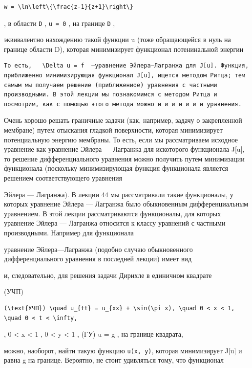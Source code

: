 \documentclass[
  ukrainian,
]{article}
\begin{document}
\begin{verbatim}
w = \ln\left\{\frac{z-1}{z+1}\right\}
\end{verbatim}

, в области \texttt{D} , \texttt{u\ =\ 0} , на границе \texttt{D} ,

эквивалентно нахождению такой функции u (тоже обращающейся в нуль на
границе области D), которая минимизирует функционал потенинальной
энергии

\begin{verbatim}
То есть,   \Delta u = f  —уравнение Эйлера—Лагранжа для J[u]. Функция, приближенно минимизирующая функционал J[u], ищется методом Ритца; тем самым мы получаем решение (приближениое) уравнения с частными производными. В этой лекции мы познакомимся с методом Ритца и посмотрим, как с помощью этого метода можно и и и и и и и уравнения.
\end{verbatim}

Очень хорошо решать граничные задачи (как, например, задачу о
закрепленной мембране) путем отыскания гладкой поверхности, которая
минимизирует потенциальную энергию мембраны. То есть, если мы
рассматриваем исходное уравнение как уравнение Эйлера --- Лагранжа для
искоторого функционала J{[}u{]}, то решение дифференциального уравнения
можно получить путем минимизации функционала (поскольку минимизирующая
функция функционала является решением соответствующего уравнения

Эйлера --- Лагранжа). В лекции 44 мы рассматривали такие функционалы, у
которых уравнение Эйлера --- Лагранжа было обыкновенным дифференциальным
уравнением. В этой лекции рассматриваются функционалы, для которых
уравнение Эйлера --- Лагранжа относится к классу уравнений с частными
производными. Например для функционала

уравнение Эйлера---Лагранжа (подобно случаю обыкновенного
дифференциального уравнения в последней лекции) имеет вид

и, следовательно, для решения задачи Дирихле в единичном квадрате

(УЧП)

\begin{verbatim}
(\text{УЧП}) \quad u_{tt} = u_{xx} + \sin(\pi x), \quad 0 < x < 1, \quad 0 < t < \infty,
\end{verbatim}

, 0 \textless{} x \textless{} 1 , 0 \textless{} y \textless{} 1 , (ГУ) u
= g , на границе квадрата,

можно, наоборот, найти такую функцию \texttt{u(x,\ y)}, которая
минимизирует J{[}u{]} и равна g на границе. Вероятно, не стоит
удивляться тому, что функционал
\end{document}
